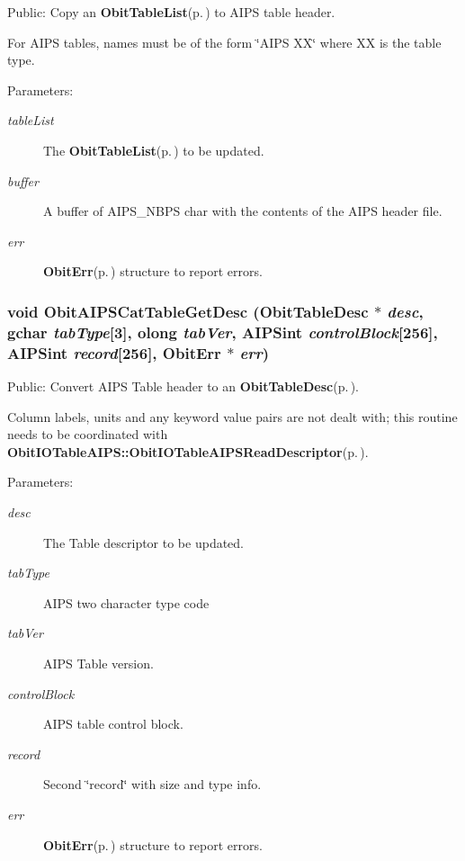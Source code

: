 Public: Copy an {\bf Obit\-Table\-List}{\rm (p.\,\pageref{structObitTableList})} to AIPS table header. 

For AIPS tables, names must be of the form \char`\"{}AIPS XX\char`\"{} where XX is the table type. \begin{Desc}
\item[Parameters:]
\begin{description}
\item[{\em table\-List}]The {\bf Obit\-Table\-List}{\rm (p.\,\pageref{structObitTableList})} to be updated. \item[{\em buffer}]A buffer of AIPS\_\-NBPS char with the contents of the AIPS header file. \item[{\em err}]{\bf Obit\-Err}{\rm (p.\,\pageref{structObitErr})} structure to report errors. \end{description}
\end{Desc}
\subsubsection{\setlength{\rightskip}{0pt plus 5cm}void Obit\-AIPSCat\-Table\-Get\-Desc ({\bf Obit\-Table\-Desc} $\ast$ {\em desc}, gchar {\em tab\-Type}[3], {\bf olong} {\em tab\-Ver}, {\bf AIPSint} {\em control\-Block}[256], {\bf AIPSint} {\em record}[256], {\bf Obit\-Err} $\ast$ {\em err})}\label{ObitAIPSCat_8c_a11}


Public: Convert AIPS Table header to an {\bf Obit\-Table\-Desc}{\rm (p.\,\pageref{structObitTableDesc})}. 

Column labels, units and any keyword value pairs are not dealt with; this routine needs to be coordinated with {\bf Obit\-IOTable\-AIPS::Obit\-IOTable\-AIPSRead\-Descriptor}{\rm (p.\,\pageref{ObitIOTableAIPS_8c_a23})}. \begin{Desc}
\item[Parameters:]
\begin{description}
\item[{\em desc}]The Table descriptor to be updated. \item[{\em tab\-Type}]AIPS two character type code \item[{\em tab\-Ver}]AIPS Table version. \item[{\em control\-Block}]AIPS table control block. \item[{\em record}]Second \char`\"{}record\char`\"{} with size and type info. \item[{\em err}]{\bf Obit\-Err}{\rm (p.\,\pageref{structObitErr})} structure to report errors. \end{description}
\end{Desc}

